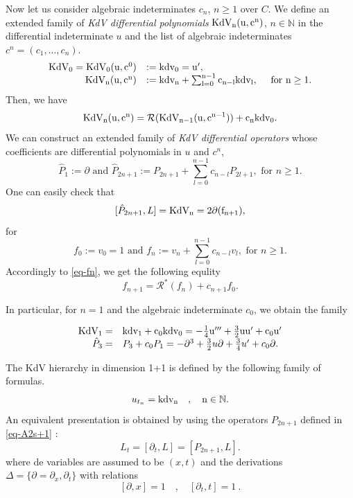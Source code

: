 \documentclass[a4paper,12pt]{article}
\newcommand{\cR}{\mathcal{R}}
\newcommand{\bbN}{\mathbb{N}}
\def\KdV{\rm KdV}
\def\kdv{\rm kdv}
\def\KdV{\rm KdV}
\begin{document}
Now let us consider algebraic indeterminates $c_n$, $n\geq 1$ over $C$. We
define an extended family of {\it KdV differential polynomials} $\KdV_n(u,c^n)$, $n\in\bbN$ in the differential indeterminate $u$ and the list of algebraic indeterminates $c^n=(c_1,\ldots ,c_n)$.
\begin{equation}
\begin{array}{rl}\label{eq-KdV}
 \KdV_0 = \KdV_0 (u,c^0 )     & :=\kdv_0 = u', \\
  \KdV_n (u,c^n )   & :=\kdv_n+\sum_{l=0}^{n-1} c_{n-l} \kdv_l, \quad \mbox{ for } n\geq 1 .
\end{array}
\end{equation}
Then, we have
\begin{equation}\label{eq-KdV-R}
   \KdV_n (u,c^n ) = \cR (  \KdV_{n-1} (u,c^{n-1} )  ) +c_n \kdv_0 .
\end{equation}
We can construct an extended family of {\it KdV differential operators} whose coefficients are differential polynomials in $u$ and $c^n$,
\begin{equation}\label{eq-Ac2s+1}
\hat{P}_1:=\partial\mbox{ and }\hat{P}_{2n+1}:=P_{2n+1}+\sum_{l=0}^{n-1} c_{n-l}P_{2l+1}, \mbox{ for } n\geq 1.
\end{equation}
One can easily check that
\begin{equation*}\label{eq-PLKdV}
[\hat{P}_{2n+1},L]=\KdV_n=2\partial(f_{n+1}),
\end{equation*}
for
\begin{equation}\label{eq-fn}
f_0:=v_0=1\mbox{ and } f_n:=v_n+ \sum_{l=0}^{n-1} c_{n-l}v_l, \mbox{ for } n\geq 1.
\end{equation}
Accordingly to \eqref{eq-fn}, we get the following equlity
\begin{equation*}\label{eq-fn-R}
     f_{n+1} = \cR^* ( f_n )+ c_{n +1} f_0 .
\end{equation*}





In particular, for $n=1$ and the  algebraic indeterminate  $c_0$, we obtain the family

\[\begin{array}{rl}
     \KdV_1 =&  \kdv_1+ c_{0} \kdv_0 =-\frac{1}{4} u'''+\frac{3}{2} u u' + c_{0} u' \\
    \hat{P}_{3} = & P_{3}+ c_{0}P_{1}= -\partial^3+\frac{3}{2} u \partial +\frac{3}{4}u' + c_{0}\partial .
\end{array}
\]


The KdV hierarchy in dimension 1+1 is defined by the following family of formulas.
\begin{equation}\label{eq-kdv-1+1}
    u_{t_n } = \kdv_n \quad , \quad n\in \bbN.
\end{equation}
An equivalent presentation is obtained by using the operators $P_{2n+1}$ defined in \eqref{eq-A2s+1} :
\begin{equation}
L_t = [\partial_t , L]=    [{P}_{2n+1},L].
\end{equation}\label{eq-P-kdv-1+1}
where de variables are assumed to be $(x,t)$ and the derivations $\Delta= \{ \partial=\partial_x , \partial_t \}$ with relations
\[
[\partial, x]=1 \quad , \quad [\partial_t ,t] =1 \ .
\]
\end{document}
